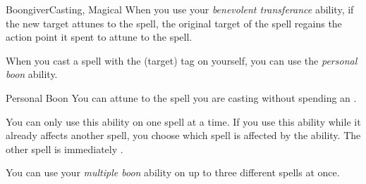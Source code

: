 \begin{feat}{Boongiver}{Casting, Magical}
         When you use your \textit{benevolent transferance} ability, if the new target attunes to the spell, the original target of the spell regains the action point it spent to attune to the spell.

         When you cast a spell with the  (target) tag on yourself, you can use the \textit{personal boon} ability.
        \begin{ability}{Personal Boon}
            You can attune to the spell you are casting without spending an .

            You can only use this ability on one spell at a time.
            If you use this ability while it already affects another spell, you choose which spell is affected by the ability.
            The other spell is immediately .
        \end{ability}

         You can use your \textit{multiple boon} ability on up to three different spells at once.
    \end{feat}

